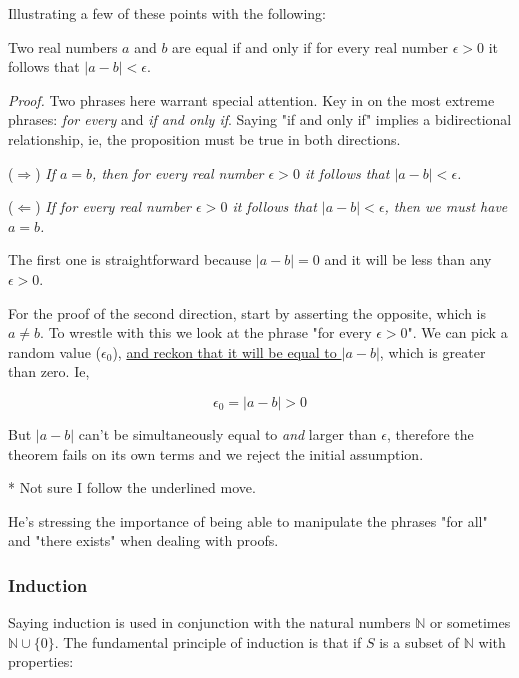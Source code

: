 \documentclass{article}
\numberwithin{equation}{subsection}
\numberwithin{theo}{subsection}
\begin{document}
Illustrating a few of these points with the following:

\begin{theo}
    \label{realnumequal}
    Two real numbers $a$ and $b$ are equal if and only if for every real number
    $\epsilon > 0$ it follows that $\lvert a-b \rvert < \epsilon$.
\end{theo}

\emph{Proof.} Two phrases here warrant special attention. Key in on the most
extreme phrases: \emph{for every} and \emph{if and only if}. Saying "if and only
if" implies a bidirectional relationship, ie, the proposition must be true in
both directions.

($\Rightarrow$) \emph{If $a=b$, then for every real number $\epsilon > 0$ it
follows that $\lvert a-b \rvert < \epsilon$.}

($\Leftarrow$) \emph{If for every real number $\epsilon > 0$ it follows that
    $\lvert a-b \rvert < \epsilon$, then we must have $a=b$.}

The first one is straightforward because $\lvert a-b \rvert = 0$ and it will be
less than any $\epsilon > 0$.

For the proof of the second direction, start by asserting the opposite, which is
$a \neq b$. To wrestle with this we look at the phrase "for every $\epsilon >
0$". We can pick a random value ($\epsilon_0$), \underline{and reckon that it will be equal
to $\lvert a-b \rvert$}, which is greater than zero. Ie,

\begin{equation*}
    \epsilon_0 = \lvert a-b \rvert > 0
\end{equation*}

But $\lvert a-b \rvert$ can't be simultaneously equal to \emph{and} larger than
$\epsilon$, therefore the theorem fails on its own terms and we reject the
initial assumption.

* Not sure I follow the underlined move.

He's stressing the importance of being able to manipulate the phrases "for all"
and "there exists" when dealing with proofs.

\subsubsection*{Induction}

Saying induction is used in conjunction with the natural numbers $\mathbb{N}$ or
sometimes $\mathbb{N} \cup \{0\}$. The fundamental principle of induction is
that if $S$ is a subset of $\mathbb{N}$ with properties:
\end{document}
